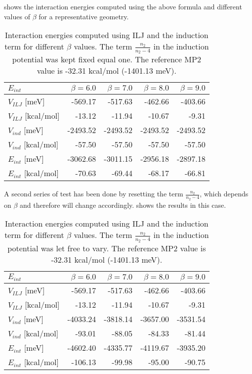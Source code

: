 \documentclass{article}
\begin{document}
%
 shows the interaction energies computed using the above formula and different values of $\beta$ for a representative geometry.
%
\begin{table}
    \centering
    \begin{tabular}{l|rrrr}
        $E_{int}$            & $\beta = 6.0$ & $\beta = 7.0$ & $\beta = 8.0$ & $\beta = 9.0$ \\
        \midrule
        $V_{ILJ}$ [meV]      &  -569.17      &  -517.63      &  -462.66      &  -403.66      \\
        $V_{ILJ}$ [kcal/mol] &   -13.12      &   -11.94      &   -10.67      &    -9.31      \\
        $V_{ind}$ [meV]      & -2493.52      & -2493.52      & -2493.52      & -2493.52      \\
        $V_{ind}$ [kcal/mol] &   -57.50      &   -57.50      &   -57.50      &   -57.50      \\
        \midrule
        $E_{int}$ [meV]      & -3062.68      & -3011.15      & -2956.18      & -2897.18      \\
        $E_{int}$ [kcal/mol] &   -70.63      &   -69.44      &   -68.17      &   -66.81
    \end{tabular}
    \caption{Interaction energies computed using ILJ and the induction term for different $\beta$ values. The term $\tfrac{n_2}{n_2 - 4}$ in the induction potential was kept fixed equal one. The reference MP2 value is -32.31 kcal/mol (-1401.13 meV).}
    \label{tab:eint_geo_1_ind_1}
\end{table}
%
A second series of test has been done by resetting the term $\tfrac{n_2}{n_2 - 4}$, which depends on $\beta$ and therefore will change accordingly.
 shows the results in this case.
%
\begin{table}
    \centering
    \begin{tabular}{l|rrrr}
        $E_{int}$            & $\beta = 6.0$ & $\beta = 7.0$ & $\beta = 8.0$ & $\beta = 9.0$ \\
        \midrule
        $V_{ILJ}$ [meV]      &  -569.17      &  -517.63      &  -462.66      &  -403.66      \\
        $V_{ILJ}$ [kcal/mol] &   -13.12      &   -11.94      &   -10.67      &    -9.31      \\
        $V_{ind}$ [meV]      & -4033.24      & -3818.14      & -3657.00      & -3531.54      \\
        $V_{ind}$ [kcal/mol] &   -93.01      &   -88.05      &   -84.33      &   -81.44      \\
        \midrule
        $E_{int}$ [meV]      & -4602.40      & -4335.77      & -4119.67      & -3935.20      \\
        $E_{int}$ [kcal/mol] &  -106.13      &   -99.98      &   -95.00      &   -90.75
    \end{tabular}
    \caption{Interaction energies computed using ILJ and the induction term for different $\beta$ values. The term $\tfrac{n_2}{n_2 - 4}$ in the induction potential was let free to vary. The reference MP2 value is -32.31 kcal/mol (-1401.13 meV).}
    \label{tab:eint_geo_1_ind_beta}
\end{table}
\end{document}
